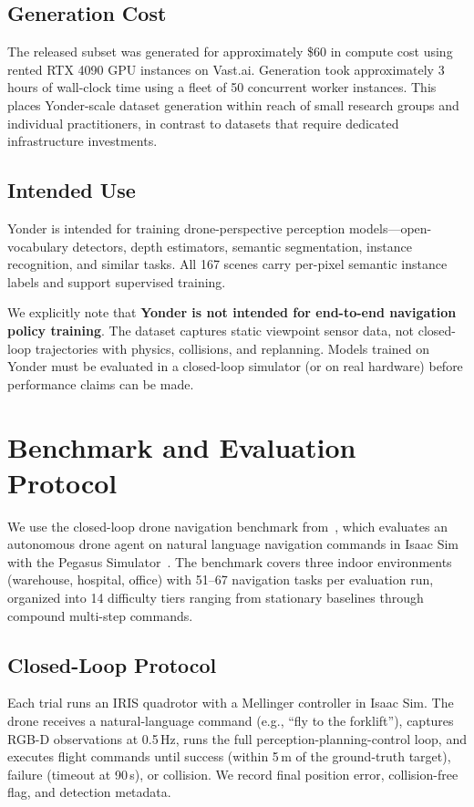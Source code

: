 \documentclass[conference]{IEEEtran}
\begin{document}
\subsection{Generation Cost}

The released subset was generated for approximately \$60 in compute cost using rented RTX 4090 GPU instances on Vast.ai. Generation took approximately 3 hours of wall-clock time using a fleet of 50 concurrent worker instances. This places Yonder-scale dataset generation within reach of small research groups and individual practitioners, in contrast to datasets that require dedicated infrastructure investments.

\subsection{Intended Use}

Yonder is intended for training drone-perspective perception models---open-vocabulary detectors, depth estimators, semantic segmentation, instance recognition, and similar tasks. All 167 scenes carry per-pixel semantic instance labels and support supervised training.

We explicitly note that \textbf{Yonder is not intended for end-to-end navigation policy training}. The dataset captures static viewpoint sensor data, not closed-loop trajectories with physics, collisions, and replanning. Models trained on Yonder must be evaluated in a closed-loop simulator (or on real hardware) before performance claims can be made.

\section{Benchmark and Evaluation Protocol}

We use the closed-loop drone navigation benchmark from~\cite{anon2026closing}, which evaluates an autonomous drone agent on natural language navigation commands in Isaac Sim with the Pegasus Simulator~\cite{jacinto2024pegasus}. The benchmark covers three indoor environments (warehouse, hospital, office) with 51--67 navigation tasks per evaluation run, organized into 14 difficulty tiers ranging from stationary baselines through compound multi-step commands.

\subsection{Closed-Loop Protocol}

Each trial runs an IRIS quadrotor with a Mellinger controller in Isaac Sim. The drone receives a natural-language command (e.g., ``fly to the forklift''), captures RGB-D observations at 0.5\,Hz, runs the full perception-planning-control loop, and executes flight commands until success (within 5\,m of the ground-truth target), failure (timeout at 90\,s), or collision. We record final position error, collision-free flag, and detection metadata.
\end{document}
